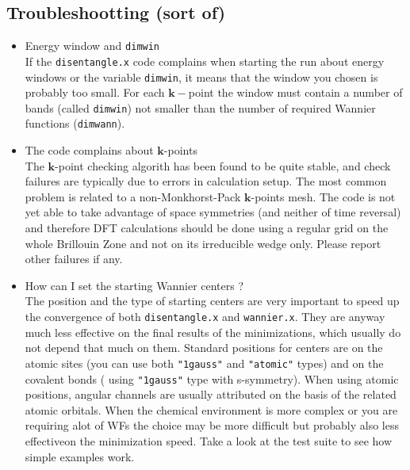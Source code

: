 \subsection{Troubleshootting (sort of)}
\label{subsec:troubleshoot}

%
%
\begin{itemize}
\item   {Energy window and {\tt dimwin}} \\
        If the {\tt disentangle.x} code complains when starting the run about
        energy windows or the variable {\tt dimwin}, it means that the window you 
        chosen is probably too small.  For each $\mathbf{k}-$point the window
        must contain a number of bands (called {\tt dimwin}) not smaller than
        the number of required Wannier functions ({\tt dimwann}).

\item   {The code complains about $\mathbf{k}$-points} \\
        The $\mathbf{k}$-point checking algorith has been found to be quite stable, 
        and check failures are typically due to errors in calculation setup.
        The most common problem is related to a non-Monkhorst-Pack $\mathbf{k}$-points
        mesh. The code is not yet able to take advantage of space symmetries (and
        neither of time reversal) and therefore DFT calculations should be done using
        a regular grid on the whole Brillouin Zone and not on its irreducible wedge only.
        Please report other failures if any.

\item   {How can I set the starting Wannier centers ? } \\
        The position and the type of starting centers are very important to speed up
        the convergence of both {\tt disentangle.x} and {\tt wannier.x}. They are
        anyway much less effective on the final results of the minimizations, 
        which usually do not depend that much on them. Standard positions for 
        centers are on the atomic sites (you can use both {\tt "1gauss"} and 
        {\tt "atomic"} types) and on the covalent bonds ( using {\tt "1gauss"} type 
        with s-symmetry). When using atomic positions, angular channels are usually 
        attributed on the basis of the related atomic orbitals. 
        When the chemical environment is more complex or you are
        requiring alot of WFs the choice may be more difficult but probably also
        less effectiveon the minimization speed. Take a look at the 
        test suite to see how simple examples work.


\end{itemize}
